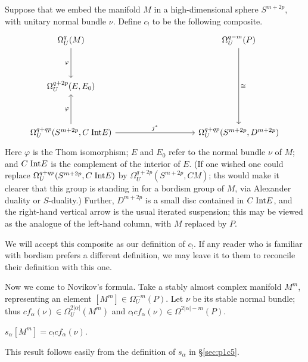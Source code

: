 \documentclass[../main]{subfiles}
\begin{document}
Suppose that we embed the manifold $M$ in a high-dimensional sphere $S^{m+2p}$, with unitary normal bundle $\nu$. Define $c_!$ to be the following composite.
\[
\begin{tikzcd}
\Omega_U^q(M) \arrow[dd, "\varphi"']                                            &  &  &  & \Omega_U^{q-m}(P) \arrow[dddd, "\cong"] \\
                                                                                &  &  &  &                                         \\
{\Omega_U^{q+2p}(E,E_0)}                                                        &  &  &  &                                         \\
                                                                                &  &  &  &                                         \\
{\Omega_U^{q+qp}(S^{m+2p}, C \hspace{0.1cm} \Int E)} \arrow[uu, "\varphi"] \arrow[rrrr, "j^*"] &  &  &  & {\Omega_U^{q+qp}(S^{m+2p}, D^{m+2p})} 
\end{tikzcd}
\]
Here $\varphi$ is the Thom isomorphism; $E$ and $E_0$ refer to the normal bundle $\nu$ of $M$; and $C \hspace{0.1cm} \mathrm{Int} E$ is the complement of the interior of $E$. (If one wished one could replace $\Omega_U^{q+qp}(S^{m+2p}, C \hspace{0.1cm} \mathrm{Int} E)$ by $\Omega_U^{q+2p}(S^{m+2p}, CM)$; ths would make it clearer that this group is standing in for a bordism group of $M$, via Alexander duality or $S$-duality.) Further, $D^{m+2p}$ is a small disc contained in $C \hspace{0.1cm} \mathrm{Int} E$, and the right-hand vertical arrow is the usual iterated suspension; this may be viewed as the analogue of the left-hand column, with $M$ replaced by $P$.

We will accept this composite as our definition of $c_!$. If any reader who is familiar with bordism prefers a different definition, we may leave it to them to reconcile their definition with this one.

Now we come to Novikov's formula. Take a stably almost complex manifold $M^m$, representing an element $[M^m] \in \Omega_U^{-m}(P)$. Let $\nu$ be its stable normal bundle; thus $cf_\alpha(\nu) \in \Omega_U^{2|\alpha|}(M^m)$ and $c_! cf_\alpha(\nu) \in \Omega^{2|\alpha|-m}(P)$.

\begin{thm}[Novikov]\label{thm:p1c08.3}
$s_\alpha[M^m] = c_!cf_\alpha(\nu)$.
\end{thm}
This result follows easily from the definition of $s_\alpha$ in \S\ref{sec:p1c5}.
\end{document}
